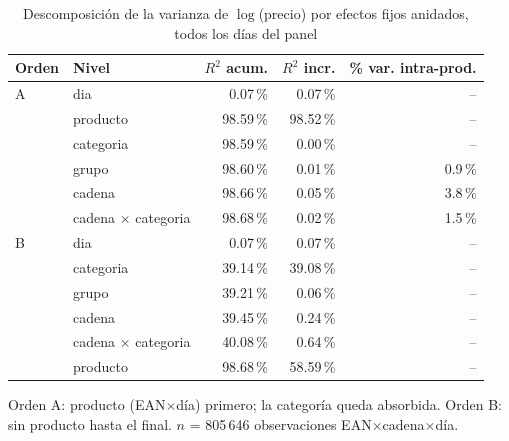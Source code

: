 \begin{table}[htbp]
\caption{Descomposici\'on de la varianza de $\log$(precio) por efectos fijos anidados, todos los d\'ias del panel}
\label{tab:varianza}
\centering\scriptsize\setlength{\tabcolsep}{3pt}
\begin{tabular}{@{}llrrr@{}}
\toprule
Orden & Nivel & $R^2$ acum. & $R^2$ incr. & \% var. intra-prod. \\
\midrule
A & dia & 0.07\,\% & 0.07\,\% & -- \\
 & producto & 98.59\,\% & 98.52\,\% & -- \\
 & categoria & 98.59\,\% & 0.00\,\% & -- \\
 & grupo & 98.60\,\% & 0.01\,\% & 0.9\,\% \\
 & cadena & 98.66\,\% & 0.05\,\% & 3.8\,\% \\
 & cadena $\times$ categoria & 98.68\,\% & 0.02\,\% & 1.5\,\% \\
\midrule
B & dia & 0.07\,\% & 0.07\,\% & -- \\
 & categoria & 39.14\,\% & 39.08\,\% & -- \\
 & grupo & 39.21\,\% & 0.06\,\% & -- \\
 & cadena & 39.45\,\% & 0.24\,\% & -- \\
 & cadena $\times$ categoria & 40.08\,\% & 0.64\,\% & -- \\
 & producto & 98.68\,\% & 58.59\,\% & -- \\
\bottomrule\end{tabular}
\par\smallskip\raggedright\scriptsize Orden A: producto (EAN$\times$d\'ia) primero; la categor\'ia queda absorbida. Orden B: sin producto hasta el final. $n$ = 805\,646 observaciones EAN$\times$cadena$\times$d\'ia.
\end{table}
